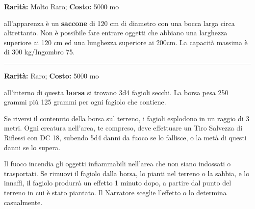 \begin{multicols}{2}
\textbf{Rarità:} Molto Raro; \textbf{Costo:} 5000 mo

all'apparenza è un \textbf{saccone} di 120 cm di diametro con una bocca larga circa altrettanto.
Non è possibile fare entrare oggetti che abbiano una larghezza superiore ai 120 cm ed una lunghezza superiore ai 200cm. La capacità massima è di 300 kg/Ingombro 75.

\smallskip\noindent\rule{\linewidth}{2pt}  \hypertarget{BorsadeiFagioli}{}\smallskip{}\noindent\label{BorsadeiFagioli}

\textbf{Rarità:} Raro; \textbf{Costo:} 5000 mo

all'interno di questa \textbf{borsa} si trovano 3d4 fagioli secchi. La borsa pesa 250 grammi più 125 grammi per ogni fagiolo che contiene.

Se riversi il contenuto della borsa sul terreno, i fagioli esplodono in un raggio di 3 metri. Ogni creatura nell'area, te compreso, deve effettuare un Tiro Salvezza di Riflessi con DC 18, subendo 5d4 danni da fuoco se lo fallisce, o la metà di questi danni se lo supera.

Il fuoco incendia gli oggetti infiammabili nell'area che non siano indossati o trasportati. Se rimuovi il fagiolo dalla borsa, lo pianti nel terreno o la sabbia, e lo innaffi, il fagiolo produrrà un effetto 1 minuto dopo, a partire dal punto del terreno in cui è stato piantato. Il Narratore sceglie l'effetto o lo determina casualmente.

\medskip


\end{multicols}
